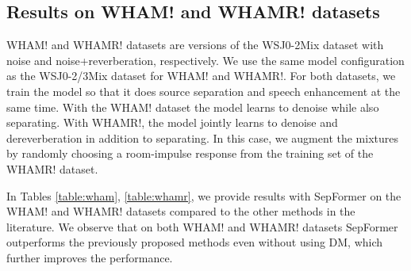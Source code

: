 \documentclass[lettersize,journal]{IEEEtran}
\begin{document}
\subsection{Results on WHAM! and WHAMR! datasets}
WHAM! \cite{wichern2019wham} and WHAMR! \cite{maciejewski2020whamr} datasets are versions of the WSJ0-2Mix dataset with noise and  noise+reverberation, respectively. We use the same model configuration as the WSJ0-2/3Mix dataset for WHAM! and WHAMR!. For both datasets, we train the model so that it does source separation and speech enhancement at the same time. With the WHAM! dataset the model learns to denoise while also separating. With WHAMR!, the model jointly learns to denoise and dereverberation in addition to separating. In this case, we augment the mixtures by randomly choosing a room-impulse response from the training set of the WHAMR! dataset.

In Tables \ref{table:wham}, \ref{table:whamr}, we provide results with SepFormer on the WHAM! and WHAMR! datasets compared to the other methods in the literature. We observe that on both WHAM! and WHAMR! datasets SepFormer outperforms the previously proposed methods even without using DM, which further improves the performance.

\begin{table}[t]
\centering
\small
 \caption{Best results on the WHAM dataset.}
 \vspace{0.2cm}
 \label{table:wham}
 \centering
\end{table}
\end{document}

